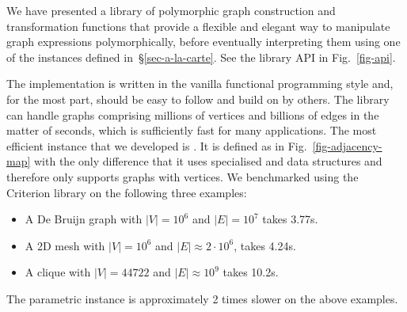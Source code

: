 We have presented a library of polymorphic graph construction and
transformation functions that
provide a flexible and elegant way to manipulate graph expressions
polymorphically, before eventually interpreting them using one of the 
instances defined in~\S\ref{sec-a-la-carte}. See the library API in
Fig.~\ref{fig-api}.

The implementation is written in the vanilla functional programming style
and, for the most part, should be easy to follow and build on by others.
The library can handle graphs
comprising millions of vertices and billions of edges in the matter of
seconds, which is sufficiently fast for many applications.
The most efficient  instance that we developed is .
It is defined as in Fig.~\ref{fig-adjacency-map} with the only difference
that it uses specialised  and  data structures and therefore
only supports graphs with  vertices. We benchmarked 
using the \textsf{Criterion} library on the following three examples:

\begin{itemize}
    \item A De Bruijn graph  with
    $|V|=10^6$ and $|E|=10^7$ takes 3.77s.

    \item A 2D mesh 
    with $|V|=10^6$ and $|E| \approx 2\cdot 10^6$, takes 4.24s.

    \item A clique  with $|V|=44722$ and $|E| \approx 10^9$
    takes 10.2s.
\end{itemize}

The parametric  instance is approximately 2 times slower
on the above examples.
